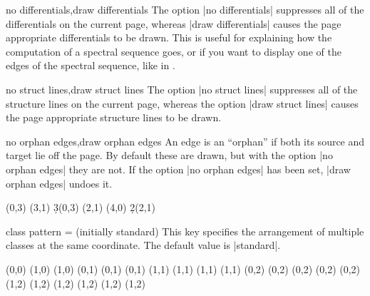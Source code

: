 \begin{sseqdata}[name = basic, cohomological Serre grading]
\begin{keylist}{no differentials,draw differentials}
The option |no differentials| suppresses all of the differentials on the current
page, whereas |draw differentials| causes the page appropriate differentials to
be drawn. This is useful for explaining how the computation of a spectral
sequence goes, or if you want to display one of the edges of the spectral
sequence, like in .
\end{keylist}

\begin{keylist}{no struct lines,draw struct lines}
The option |no struct lines| suppresses all of the structure lines on the
current page, whereas the option |draw struct lines| causes the page appropriate
structure lines to be drawn.
\end{keylist}

\begin{keylist}{no orphan edges,draw orphan edges}
An edge is an ``orphan'' if both its source and target lie off the page. By
default these are drawn, but with the option |no orphan edges| they are not. If
the option |no orphan edges| has been set, |draw orphan edges| undoes it.
\begin{codeexample}[width = 9cm]
\begin{sseqdata}[
    name = orphan edges example,
    cohomological Serre grading,
    x range = {0}{2}, y range = {0}{2} ]
\class(0,3) \class(3,1)
\d3(0,3)
\class(2,1) \class(4,0)
\d2(2,1)
\end{sseqdata}
\printpage[ name = orphan edges example ]
\quad
\printpage[ name = orphan edges example,
            no orphan edges ]
\end{codeexample}
\end{keylist}


\begin{key}{class pattern =  (initially standard)}%
This key specifies the arrangement of multiple classes at the same coordinate.
The default value is |standard|.
\begin{codeexample}[width = 5cm]
\begin{sseqdata}[ name = class pattern example, no axes, ymirror ]
\class(0,0)
\class(1,0) \class(1,0)
\class(0,1) \class(0,1) \class(0,1)
\class(1,1) \class(1,1) \class(1,1) \class(1,1)
\class(0,2) \class(0,2) \class(0,2) \class(0,2) \class(0,2)
\class(1,2) \class(1,2) \class(1,2) \class(1,2) \class(1,2) \class(1,2)
\end{sseqdata}


\end{codeexample}
\end{key}
\end{sseqdata}

